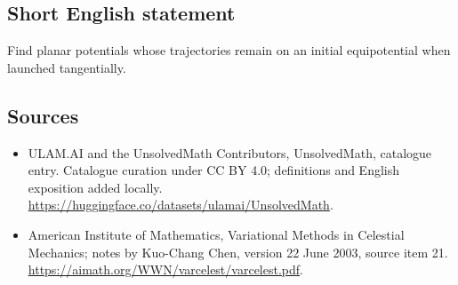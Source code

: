 \documentclass[11pt]{article}
\begin{document}
\subsection{Short English statement}
Find planar potentials whose trajectories remain on an initial equipotential when launched tangentially.
\subsection{Sources}
\begin{itemize}
\item[\hypertarget{source:statement:1}{S1}] ULAM.AI and the UnsolvedMath Contributors, UnsolvedMath, catalogue entry. Catalogue curation under CC BY 4.0; definitions and English exposition added locally.
\url{https://huggingface.co/datasets/ulamai/UnsolvedMath}.
\item[\hypertarget{source:statement:2}{S2}] American Institute of Mathematics, Variational Methods in Celestial Mechanics; notes by Kuo-Chang Chen, version 22 June 2003, source item 21.
\url{https://aimath.org/WWN/varcelest/varcelest.pdf}.
\end{itemize}
\label{end:statement}
\end{document}
